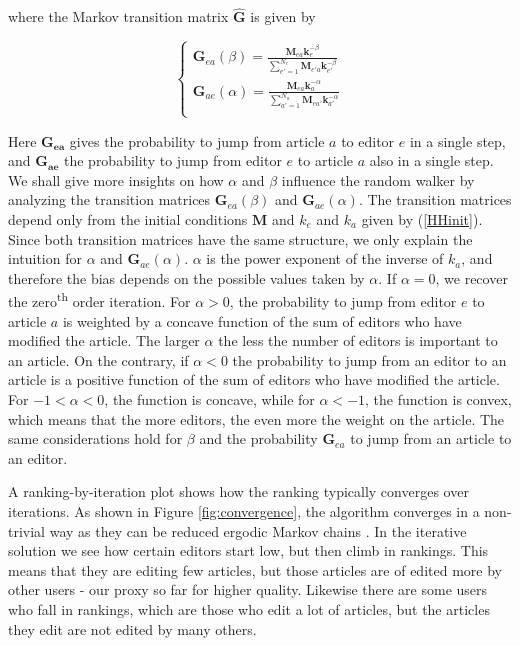 where the Markov transition matrix $\mathbf{\hat{G}}$ is given by 

\begin{equation}
\begin{cases}
\mathbf{G}_{ea}(\beta) = \frac{\mathbf{M}_{ea} \mathbf{k}_{e}^{-\beta}}{\sum_{e' = 1}^{N_e} \mathbf{M}_{e'a} \mathbf{k}_{e'}^{-\beta}}\\
\mathbf{G}_{ae}(\alpha) = \frac{\mathbf{M}_{ea} \mathbf{k}_{a}^{-\alpha}}{\sum_{a' = 1}^{N_a} \mathbf{M}_{ea'} \mathbf{k}_{a'}^{-\alpha}}\\
 \end{cases}
\end{equation}

Here $\mathbf{G_{ea}}$ gives the probability to jump from article $a$ to editor $e$ in a single step, and $\mathbf{G_{ae}}$ the probability to jump from editor $e$ to article $a$ also in a single step. We shall give more insights on how $\alpha$ and $\beta$ influence the random walker by analyzing the transition matrices $\mathbf{G}_{ea}(\beta)$ and $\mathbf{G}_{ae}(\alpha)$. The transition matrices depend only from the initial conditions $\mathbf{M}$ and $k_e$ and $k_a$ given by (\ref{HHinit}). Since both transition matrices have the same structure, we only explain the intuition for  $\alpha$ and $\mathbf{G}_{ae}(\alpha)$. $\alpha$ is the power exponent of the inverse of $k_a$, and therefore the bias depends on the possible values taken by $\alpha$. If $\alpha = 0$, we recover the zero\textsuperscript{th} order iteration. For $\alpha > 0$, the probability to jump from editor $e$ to article $a$ is weighted by a concave function of the sum of editors who have modified the article. The larger $\alpha$ the less the number of editors is important to an article. On the contrary, if $\alpha < 0$ the probability to jump from an editor to an article is a positive function of the sum of editors who have modified the article. For $-1 < \alpha < 0$, the function is concave, while for $\alpha < -1$, the function is convex, which means that the more editors, the even more the weight on the article. The same considerations hold for $\beta$ and the probability $\mathbf{G}_{ea}$ to jump from an article to an editor.

A ranking-by-iteration plot shows how the ranking typically converges over iterations. As shown in Figure \ref{fig:convergence}, the algorithm converges in a non-trivial way as they can be reduced ergodic Markov chains \cite{caldarelli2012network}. In the iterative solution we see how certain editors start low, but then climb in rankings. This means that they are editing few articles, but those articles are of edited more by other users - our proxy so far for higher quality. Likewise there are some users who fall in rankings, which are those who edit a lot of articles, but the articles they edit are not edited by many others.

